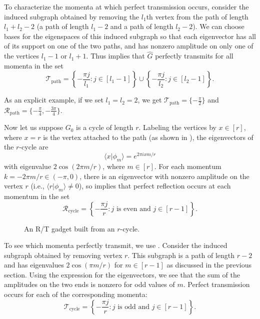 \documentclass[../thesis-main/thesis-main]{subfiles}
\begin{document}
To characterize the momenta at which perfect transmission occurs, consider the induced subgraph obtained by removing the $l_1$th vertex from the path of length $l_1+l_2-2$ (a path of length $l_1-2$ and a path of length $l_2-2$). We can choose bases for the eigenspaces of this induced subgraph so that each eigenvector has all of its support on one of the two paths, and has nonzero amplitude on only one of the vertices $l_1-1$ or $l_1+1$. Thus  implies that $\widehat{G}$ perfectly transmits for all momenta in the set
\begin{equation}
  \mathcal{T}_{\mathrm{path}} = \left\{- \frac{\pi j}{l_1} \colon j\in [l_1-1]\right\} \cup \left\{-\frac{\pi j}{l_2 } \colon j \in [l_2-1]\right\}.
\end{equation}

As an explicit example, if we set $l_1 = l_2 = 2$, we get $\mathcal{T}_{\mathrm{path}} = \{-\frac{\pi}{2}\}$ and $\mathcal{R}_{\mathrm{path}} = \{-\frac{\pi}{4}, -\frac{3\pi}{4}\}$.


Now let us suppose $G_0$ is a cycle of length $r$. Labeling the vertices by $x \in [r]$, where $x=r$ is the vertex attached to the path (as shown in ), the eigenvectors of the $r$-cycle are
\begin{equation}
  \langle x | \phi_m\rangle = e^{{2 \pi i x m}/{r}}
\end{equation}
with eigenvalue $2 \cos(2 \pi m/r)$, where $m\in [r]$. For each momentum $k=-2 \pi m/r \in (-\pi,0)$, there is an eigenvector with nonzero amplitude on the vertex $r$ (i.e., $\langle r | \phi_m\rangle\neq 0$), so  implies that perfect reflection occurs at each momentum in the set
\begin{equation}
  \mathcal{R}_{\mathrm{cycle}} = \left\{ -\frac{\pi j}{r} \colon \text{$j$ is even and $j\in [r-1]$}\right\}.
\end{equation}


\begin{figure}
  \centering
  
  \caption[An R/T gadget from a cycle]{An R/T gadget built from an $r$-cycle.}
  \label{fig:RT_cycle}
\end{figure}


To see which momenta perfectly transmit, we use . Consider the induced subgraph obtained by removing vertex $r$. This subgraph is a path of length $r-2$ and has eigenvalues $2\cos(\pi m/r)$ for $m \in [r-1]$ as discussed in the previous section. Using the expression  for the eigenvectors, we see that the sum of the amplitudes on the two ends is nonzero for odd values of $m$.  Perfect transmission occurs for each of the corresponding momenta:  
\begin{equation}
  \mathcal{T}_{\mathrm{cycle}} = \left\{ -\frac{\pi j}{r} \colon \text{$j$ is odd and $j\in [r-1]$}\right\}.
\end{equation}
\end{document}
